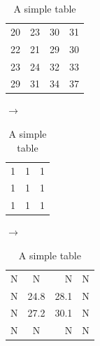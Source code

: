 \begin{table}[!ht]
  \begin{center}
    \begin{tabular}{| l c r c |}
    \hline
    20 & 23 & 30 & 31 \\
    22 & 21 & 29 & 30\\
    23 & 24 & 32 & 33\\
    29 & 31 & 34 & 37\\
    \hline
    \end{tabular}
  \end{center}
  \caption{A simple table}
\end{table}
$\longrightarrow$
\begin{table}[!ht]
  \begin{center}
    \begin{tabular}{| l c r |}
    \hline
    1 & 1 & 1 \\
    1 & 1 & 1 \\
    1 & 1 & 1 \\
    \hline
    \end{tabular}
  \end{center}
  \caption{A simple table}
\end{table}
$\longrightarrow$
\begin{table}[!ht]
  \begin{center}
    \begin{tabular}{| l c r c |}
    \hline
    N & N & N & N \\
    N & 24.8 & 28.1 & N\\
    N & 27.2 & 30.1 & N\\
    N & N & N & N\\
    \hline
    \end{tabular}
  \end{center}
  \caption{A simple table}
\end{table}



